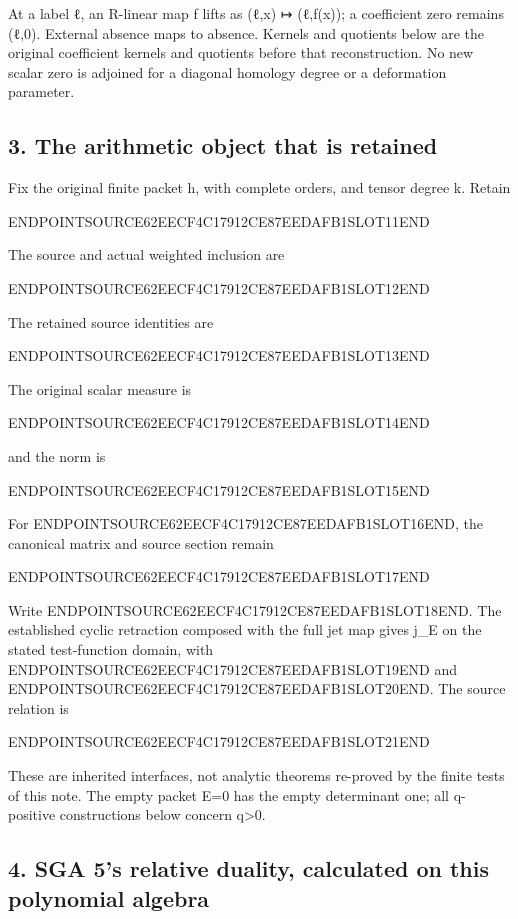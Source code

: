 At a label ℓ, an R-linear map f lifts as (ℓ,x) ↦ (ℓ,f(x)); a coefficient zero remains (ℓ,0). External absence maps to absence. Kernels and quotients below are the original coefficient kernels and quotients before that reconstruction. No new scalar zero is adjoined for a diagonal homology degree or a deformation parameter.

\subsection{3. The arithmetic object that is retained}\label{endpoint-sga_trace_period--the-arithmetic-object-that-is-retained}

Fix the original finite packet h, with complete orders, and tensor degree k. Retain

ENDPOINTSOURCE62EECF4C17912CE87EEDAFB1SLOT11END

The source and actual weighted inclusion are

ENDPOINTSOURCE62EECF4C17912CE87EEDAFB1SLOT12END

The retained source identities are

ENDPOINTSOURCE62EECF4C17912CE87EEDAFB1SLOT13END

The original scalar measure is

ENDPOINTSOURCE62EECF4C17912CE87EEDAFB1SLOT14END

and the norm is

ENDPOINTSOURCE62EECF4C17912CE87EEDAFB1SLOT15END

For ENDPOINTSOURCE62EECF4C17912CE87EEDAFB1SLOT16END, the canonical matrix and source section remain

ENDPOINTSOURCE62EECF4C17912CE87EEDAFB1SLOT17END

Write ENDPOINTSOURCE62EECF4C17912CE87EEDAFB1SLOT18END. The established cyclic retraction composed with the full jet map gives j\_E on the stated test-function domain, with ENDPOINTSOURCE62EECF4C17912CE87EEDAFB1SLOT19END and ENDPOINTSOURCE62EECF4C17912CE87EEDAFB1SLOT20END. The source relation is

ENDPOINTSOURCE62EECF4C17912CE87EEDAFB1SLOT21END

These are inherited interfaces, not analytic theorems re-proved by the finite tests of this note. The empty packet E=0 has the empty determinant one; all q-positive constructions below concern q\textgreater0.

\subsection{4. SGA 5's relative duality, calculated on this polynomial algebra}\label{endpoint-sga_trace_period--sga-5s-relative-duality-calculated-on-this-polynomial-algebra}

